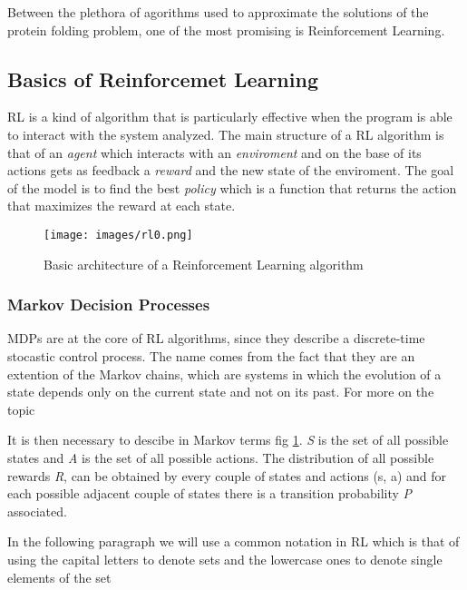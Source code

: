 Between the plethora of agorithms used to approximate the solutions of the protein folding problem, one of the most promising is Reinforcement Learning.

\subsection{Basics of Reinforcemet Learning} \label{BRL}

RL is a kind of algorithm that is particularly effective when the program is able to interact with the system analyzed. The main structure of a RL algorithm is that of an \emph{agent} which interacts with an \emph{enviroment} and on the base of its actions gets as feedback a \emph{reward} and the new state of the enviroment. The goal of the model is to find the best \emph{policy} which is a function that returns the action that maximizes the reward at each state.

\FloatBarrier
\begin{figure} [ht!]
    \centering
    \texttt{[image: images/rl0.png]}
    \caption{Basic architecture of a Reinforcement Learning algorithm}
    \label{fig:rl0}
\end{figure}
\FloatBarrier

\subsubsection{Markov Decision Processes}

MDPs are at the core of RL algorithms, since they describe a discrete-time stocastic control process. The name comes from the fact that they are an extention of the Markov chains, which are systems in which the evolution of a state depends only on the current state and not on its past. For more on the topic 


It is then necessary to descibe in Markov terms fig \ref{fig:rl0}. \emph{S} is the set of all possible states and \emph{A} is the set of all possible actions. The distribution of all possible rewards \emph{R}, can be obtained by every couple of states and actions (s, a) and for each possible adjacent couple of states there is a transition probability \emph{P} associated.

In the following paragraph we will use a common notation in RL which is that of using the capital letters to denote sets and the lowercase ones to denote single elements of the set

